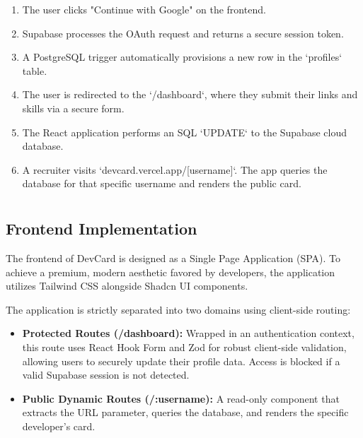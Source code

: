 \documentclass[12pt,a4paper]{report}     %
\begin{document}
\begin{enumerate}
    \item The user clicks "Continue with Google" on the frontend.
    \item Supabase processes the OAuth request and returns a secure session token.
    \item A PostgreSQL trigger automatically provisions a new row in the `profiles` table.
    \item The user is redirected to the `/dashboard`, where they submit their links and skills via a secure form.
    \item The React application performs an SQL `UPDATE` to the Supabase cloud database.
    \item A recruiter visits `devcard.vercel.app/[username]`. The app queries the database for that specific username and renders the public card.
\end{enumerate}

\vspace{0.3cm}


\chapter{}

\section{Frontend Implementation}

The frontend of DevCard is designed as a Single Page Application (SPA). To achieve a premium, modern aesthetic favored by developers, the application utilizes Tailwind CSS alongside Shadcn UI components. 

The application is strictly separated into two domains using client-side routing:

\begin{itemize}
    \item \textbf{Protected Routes (/dashboard):} Wrapped in an authentication context, this route uses React Hook Form and Zod for robust client-side validation, allowing users to securely update their profile data. Access is blocked if a valid Supabase session is not detected.
    \item \textbf{Public Dynamic Routes (/:username):} A read-only component that extracts the URL parameter, queries the database, and renders the specific developer's card.
\end{itemize}
\end{document}
